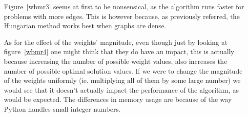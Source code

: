 \documentclass[a4,11pt]{article}
\begin{document}
Figure~\ref{wbmr3} seems at first to be nonsensical, as the algorithm runs faster for problems with more edges. This is however because, as previously referred, the Hungarian method works best when graphs are dense.

As for the effect of the weights' magnitude, even though just by looking at figure~\ref{wbmr4} one might think that they do have an impact, this is actually because increasing the number of possible weight values, also increases the number of possible optimal solution values. If we were to change the magnitude of the weights uniformly (ie. multiplying all of them by some large number) we would see that it doesn't actually impact the performance of the algorithm, as would be expected. The differences in memory usage are because of the way Python handles small integer numbers.
\end{document}
